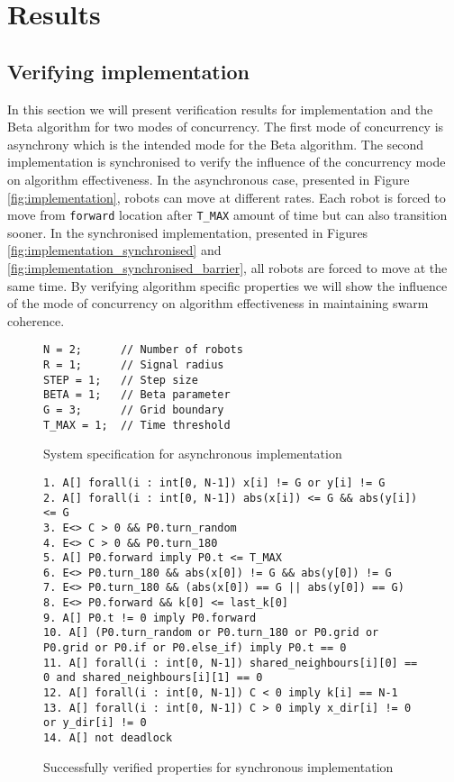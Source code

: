 \section{Results}
\subsection{Verifying implementation}
In this section we will present verification results for implementation and the Beta algorithm for two modes of concurrency. The first mode of concurrency is asynchrony which is the intended mode for the Beta algorithm. The second implementation is synchronised to verify the influence of the concurrency mode on algorithm effectiveness. In the asynchronous case, presented in Figure \ref{fig:implementation}, robots can move at different rates. Each robot is forced to move from \texttt{forward} location after \texttt{T\_MAX} amount of time but can also transition sooner. In the synchronised implementation, presented in Figures \ref{fig:implementation_synchronised} and \ref{fig:implementation_synchronised_barrier}, all robots are forced to move at the same time. By verifying algorithm specific properties we will show the influence of the mode of concurrency on algorithm effectiveness in maintaining swarm coherence.

\begin{figure}[H]
\caption{System specification for asynchronous implementation}
\label{fig:implementation_asynchronous_system}
\begin{lstlisting}[style=code]
N = 2;      // Number of robots
R = 1;      // Signal radius
STEP = 1;   // Step size
BETA = 1;   // Beta parameter
G = 3;      // Grid boundary
T_MAX = 1;  // Time threshold
\end{lstlisting}
\end{figure}

\begin{figure}[H]
\caption{Successfully verified properties for synchronous implementation}
\label{fig:implementation_asynchronous_properties}
\begin{lstlisting}[style=code]
1. A[] forall(i : int[0, N-1]) x[i] != G or y[i] != G
2. A[] forall(i : int[0, N-1]) abs(x[i]) <= G && abs(y[i]) <= G
3. E<> C > 0 && P0.turn_random
4. E<> C > 0 && P0.turn_180
5. A[] P0.forward imply P0.t <= T_MAX
6. E<> P0.turn_180 && abs(x[0]) != G && abs(y[0]) != G 
7. E<> P0.turn_180 && (abs(x[0]) == G || abs(y[0]) == G)
8. E<> P0.forward && k[0] <= last_k[0]
9. A[] P0.t != 0 imply P0.forward
10. A[] (P0.turn_random or P0.turn_180 or P0.grid or P0.grid or P0.if or P0.else_if) imply P0.t == 0
11. A[] forall(i : int[0, N-1]) shared_neighbours[i][0] == 0 and shared_neighbours[i][1] == 0
12. A[] forall(i : int[0, N-1]) C < 0 imply k[i] == N-1
13. A[] forall(i : int[0, N-1]) C > 0 imply x_dir[i] != 0 or y_dir[i] != 0
14. A[] not deadlock
\end{lstlisting}    
\end{figure}

